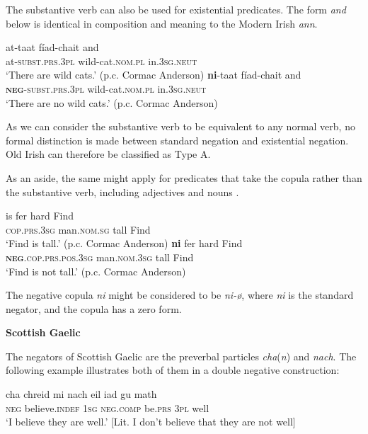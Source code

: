 ﻿\documentclass[output=paper]{langsci/langscibook}
\begin{document}
\begin{unindented}
The substantive verb can also be used for existential predicates. The form \textit{and} below is identical in composition and meaning to the Modern Irish \textit{ann}. 
%
\begin{exe}\ex \gll at-taat fíad-chait and \\
at-\textsc{subst.prs.3pl} wild-cat.\textsc{nom.pl} in.\textsc{3sg.neut} \\
    \glt `There are wild cats.' (p.c. Cormac Anderson)
\ex \gll \textbf{ni}-taat fíad-chait and \\
\textbf{\textsc{neg}}\textsc{-subst.prs.3pl} wild-cat.\textsc{nom.pl} in.\textsc{3sg.neut} \\
    \glt `There are no wild cats.' (p.c. Cormac Anderson)
    \end{exe}

As we can consider the substantive verb to be equivalent to any normal verb, no formal distinction is made between standard negation and existential negation. Old Irish can therefore be classified as Type A.

As an aside, the same might apply for predicates that take the copula rather than the substantive verb, including adjectives and nouns \citep[39]{McCone2005}.
%
\begin{exe}\ex \gll is fer hard Find \\
\textsc{cop.prs.3sg} man.\textsc{nom.sg} tall   Find \\
    \glt `Find is tall.' (p.c. Cormac Anderson)
\ex \gll \textbf{ni} fer hard Find \\
\textbf{\textsc{neg}}\textsc{.cop.prs.pos.3sg} man.\textsc{nom.3sg} tall   Find \\
    \glt `Find is not tall.' (p.c. Cormac Anderson)
    \end{exe}

The negative copula \textit{ni} might be considered to be \textit{ni-ø}, where \textit{ni} is the standard negator, and the copula has a zero form. 

\textbf{Scottish Gaelic}

The negators of Scottish Gaelic are the preverbal particles
\textit{cha}(\textit{n}) and \textit{nach}. The following example illustrates both of them in a double negative construction:
%
\begin{exe}\ex \gll cha chreid mi  nach eil iad {gu math} \\
\textsc{neg} believe.\textsc{indef} \textsc{1sg} \textsc{neg.comp} be.\textsc{prs} \textsc{3pl} well \\
    \glt `I believe they are well.' [Lit. I don’t believe that they are not well] \citep[61]{Lamb2001}
    \end{exe}


\end{unindented}
\end{document}
